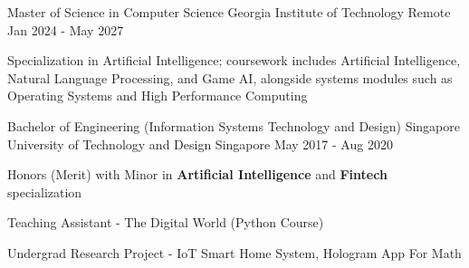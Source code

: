 
\begin{cventries}
  \cventry
    {Master of Science in Computer Science} %
    {Georgia Institute of Technology} %
    {Remote} %
    {Jan 2024 - May 2027} %
    {
      \begin{cvitems}
        \item {Specialization in Artificial Intelligence; coursework includes Artificial Intelligence, Natural Language Processing, and Game AI, alongside systems modules such as Operating Systems and High Performance Computing}
      \end{cvitems}
    }

  \cventry
    {Bachelor of Engineering (Information Systems Technology and Design)} %
    {Singapore University of Technology and Design} %
    {Singapore} %
    {May 2017 - Aug 2020} %
    {
      \begin{cvitems} %
        \item {Honors (Merit) with Minor in \textbf{Artificial Intelligence} and \textbf{Fintech} specialization}
        \item {Teaching Assistant - The Digital World (Python Course)}
        \item {Undergrad Research Project - IoT Smart Home System, Hologram App For Math}
         \end{cvitems}
    }
    
    
\end{cventries}